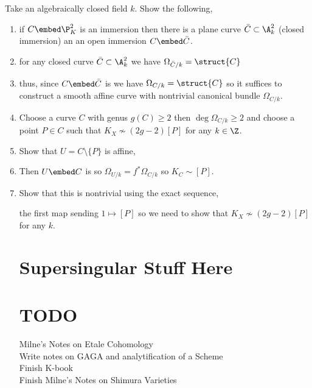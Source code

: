 \documentclass[12pt]{article}
\begin{document}
Take an algebraically closed field $k$. Show the following,
\begin{enumerate}
\item if $C \embed \P^2_K$ is an immersion then there is a plane curve $\bar{C} \subset \A^2_k$ (closed immersion) an an open immersion $C \embed \bar{C}$.
\item for any closed curve $\bar{C} \subset \A^2_k$ we have $\Omega_{\bar{C}/k} = \struct{C}$
\item thus, since $C \embed \bar{C}$ is \etale we have $\Omega_{C/k} = \struct{C}$ so it suffices to construct a smooth affine curve with nontrivial canonical bundle $\Omega_{C/k}$.
\item Choose a curve $C$ with genus $g(C) \ge 2$ then $\deg{\Omega_{C/k}} \ge 2$ and choose a point $P \in C$ such that $K_X \not\sim (2g - 2) [P]$ for any $k \in \Z$.
\item Show that $U = C \setminus \{ P \}$ is affine,
\item Then $U \embed C$ is \etale so $\Omega_{U / k} = f^* \Omega_{C/k}$ so $K_C \sim [P]$. 
\item Show that this is nontrivial using the exact sequence,
\begin{center}
\end{center}
the first map sending $1 \mapsto [P]$ so we need to show that $K_X \not\sim (2g - 2) [P]$ for any $k$. 

\section{Supersingular Stuff Here}

\section{TODO}

Milne's Notes on Etale Cohomology
\\
Write notes on GAGA and analytification of a Scheme
\\
Finish K-book
\\
Finish Milne's Notes on Shimura Varieties


\end{enumerate}
\end{document}
